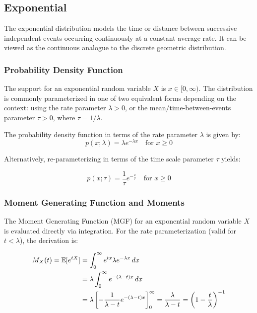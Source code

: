 \clearpage
\subsection{Exponential}
The exponential distribution models the time or distance between successive independent events occurring continuously at a constant average rate. It can be viewed as the continuous analogue to the discrete geometric distribution.

\subsubsection{Probability Density Function}
The support for an exponential random variable $X$ is $x \in [0, \infty)$. The distribution is commonly parameterized in one of two equivalent forms depending on the context: using the rate parameter $\lambda > 0$, or the mean/time-between-events parameter $\tau > 0$, where $\tau = 1/\lambda$.

The probability density function in terms of the rate parameter $\lambda$ is given by:
\begin{equation}
	p(x; \lambda) = \lambda e^{-\lambda x} \quad \text{for } x \ge 0
	\label{pdf:exponential1}
\end{equation}

Alternatively, re-parameterizing in terms of the time scale parameter $\tau$ yields:

\begin{equation}
	p(x; \tau) = \frac{1}{\tau} e^{-\frac{x}{\tau}} \quad \text{for } x \ge 0
	\label{pdf:exponential2}
\end{equation}

\subsubsection{Moment Generating Function and Moments}
The Moment Generating Function (MGF) for an exponential random variable $X$ is evaluated directly via integration. For the rate parameterization (valid for $t < \lambda$), the derivation is:

\begin{align*}
	M_X(t) = \mathbb{E}[e^{tX}] &= \int_{0}^{\infty} e^{tx} \lambda e^{-\lambda x} \, dx \\
	&= \lambda \int_{0}^{\infty} e^{-(\lambda - t)x} \, dx \\
	&= \lambda \left[ -\frac{1}{\lambda - t} e^{-(\lambda - t)x} \right]_0^{\infty} = \frac{\lambda}{\lambda - t} = \left(1 - \frac{t}{\lambda}\right)^{-1}
\end{align*}

